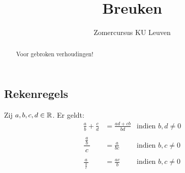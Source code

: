\documentclass[numbers,wordchoicegiven]{ximera}
\author{Zomercursus KU Leuven}
\title[Rekenvaardigheden:]{Breuken}
\begin{document}
\begin{abstract}
	Voor gebroken verhoudingen!
\end{abstract}
\maketitle

\subsection{Rekenregels}\label{breukenrekenregels}

\begin{proposition}
	
	Zij $a,b,c,d\in \mathbb R$. Er geldt:
	\begin{align*}
		\frac{a}{b}+\frac{c}{d}& =\frac{ad+cb}{bd} & \text{indien } b,d \neq 0 \\ \\
		\dfrac{\frac{a}{b}}{\ c\ }&=\frac{a}{bc}  & \text{indien }b,c \neq 0 \\ \\
		\frac{a}{\ \frac{b}{c}\ }&=\frac{ac}{b}  & \text{indien } b,c \neq 0 \\ \\
	\end{align*}
\end{proposition}
\end{document}
